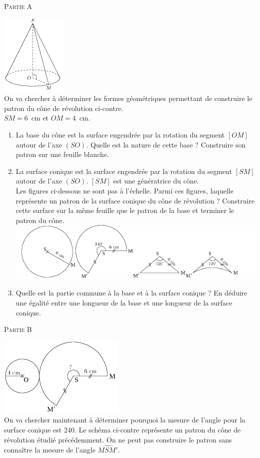
\textsc{Partie A}
\begin{multicols}{2}
\includegraphics[scale=1]{RepS-51.png}\\ 
On va chercher à déterminer les formes géométriques permettant de
construire le patron du cône de révolution ci-contre.\\
$SM=6$~cm et $OM=4$~cm.
\end{multicols}
\begin{enumerate}
\item La base du cône est la surface engendrée par la rotation du
  segment $[OM]$ autour de l'axe $(SO)$. Quelle est la nature de cette
  base ? Construire son patron sur une feuille blanche.
\item La surface conique est la surface engendrée par la rotation du
  segment $[SM]$ autour de l'axe $(SO)$. $[SM]$ est une génératrice du
  cône.\\
Les figures ci-dessous ne sont pas à l'échelle. Parmi ces figures,
laquelle représente un patron de la surface conique du cône de
révolution ? Construire cette surface sur la même feuille que le
patron de la base et terminer le patron du cône.\\
\includegraphics[scale=1]{RepS-51b.png} 
\item Quelle est la partie commune à la base et à la surface conique ?
  En déduire une égalité entre une longueur de la base et une longueur
  de la surface conique.
\end{enumerate}
\textsc{Partie B}
\begin{multicols}{2}
\includegraphics[scale=1]{RepS-51c.png} \\
On va chercher maintenant à déterminer pourquoi la mesure de l'angle
pour la surface conique est 240\degres. Le schéma ci-contre représente
un patron du cône de révolution étudié précédemment. On ne peut pas
construire le patron sans connaître la mesure de l'angle
$\widehat{MSM'}$.
\end{multicols}

